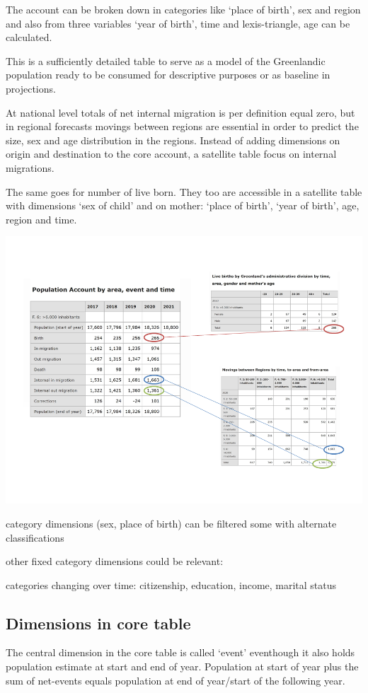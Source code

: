 \documentclass[USenglish]{article}
\begin{document}
The account can be broken down in categories like ‘place of birth’, sex and region and also from three variables ‘year of birth’, time and lexis-triangle, age can be calculated. 

This is a sufficiently detailed table to serve as a model of the Greenlandic population ready to be consumed for descriptive purposes or as baseline in projections.

At national level totals of net internal migration is per definition equal zero, but in regional forecasts movings between regions are essential in order to predict the size, sex and age distribution in the regions. Instead of adding dimensions on origin and destination to the core account, a satellite table focus on internal migrations.

The same goes for number of live born. They too are accessible in a satellite table with dimensions ‘sex of child’ and on mother: ‘place of birth’, ‘year of birth’, age, region and time.



\includegraphics[scale=0.4]{images/PopulationAccountCoreSatellite}

category dimensions (sex, place of birth) can be filtered some with alternate classifications

other fixed category dimensions could be relevant: 

categories changing over time:
citizenship, education, income, marital status


\subsection{Dimensions in core table} 
The central dimension in the core table is called ‘event’ eventhough it also holds population estimate at start and end of year. Population at start of year plus the sum of net-events equals population at end of year/start of the following year.
\end{document}
